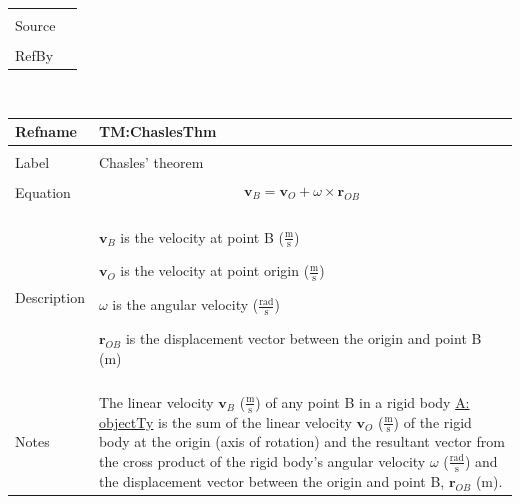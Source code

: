 \documentclass[12pt]{article}
\begin{document}
\begin{minipage}{\textwidth}
\begin{tabular}{p{} p{}}
                                         \\ \midrule \\
                                         Source & \\ \midrule \\
                                                  RefBy & 
\\ \bottomrule \end{tabular}
\end{minipage}
\par~

\noindent \begin{minipage}{\textwidth}
\begin{tabular}{p{} p{}}
\toprule \textbf{Refname} & \textbf{TM:ChaslesThm}
\label{TM:ChaslesThm}
\\ \midrule \\
Label & Chasles' theorem
        \\ \midrule \\
        Equation & \begin{displaymath}
                   {\mathbf{v}_{B}}={\mathbf{v}_{O}}+ω\times{\mathbf{r}_{OB}}
                   \end{displaymath}
                   \\ \midrule \\
                   Description & \begin{symbDescription}
                                 \item{${\mathbf{v}_{B}}$ is the velocity at point B ($\frac{\text{m}}{\text{s}}$)}
                                 \item{${\mathbf{v}_{O}}$ is the velocity at point origin ($\frac{\text{m}}{\text{s}}$)}
                                 \item{$ω$ is the angular velocity ($\frac{\text{rad}}{\text{s}}$)}
                                 \item{${\mathbf{r}_{OB}}$ is the displacement vector between the origin and point B (m)}
                                 \end{symbDescription}
                                 \\ \midrule \\
                                 Notes & The linear velocity ${\mathbf{v}_{B}}$ ($\frac{\text{m}}{\text{s}}$) of any point B in a rigid body \hyperref[assumpOT]{A: objectTy} is the sum of the linear velocity ${\mathbf{v}_{O}}$ ($\frac{\text{m}}{\text{s}}$) of the rigid body at the origin (axis of rotation) and the resultant vector from the cross product of the rigid body's angular velocity $ω$ ($\frac{\text{rad}}{\text{s}}$) and the displacement vector between the origin and point B, ${\mathbf{r}_{OB}}$ (m).

\end{tabular}
\end{minipage}
\end{document}
